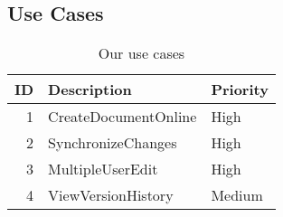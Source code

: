 \subsection{Use Cases}
\begin{table*}[ht]\centering
  \begin{tabularx}{\textwidth}{@{}rXl@{}}\toprule
    \textbf{ID} & \textbf{Description} & \textbf{Priority} \\\hline
    1
    & CreateDocumentOnline
    & High \\\hline
    2 
    & SynchronizeChanges
    & High \\\hline
    3 
    & MultipleUserEdit
    & High \\\hline
    4 
    & ViewVersionHistory
    & Medium \\
    \bottomrule
  \end{tabularx}
  \caption{Our use cases}
  \label{usecases}\centering%
\end{table*}

